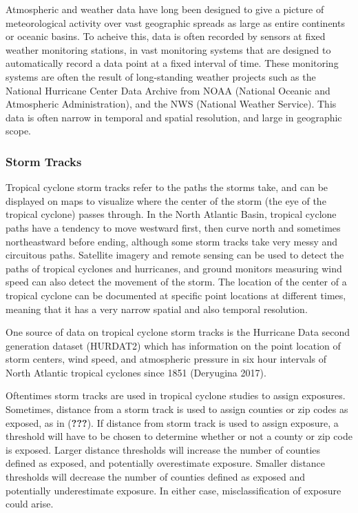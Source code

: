 \documentclass[
]{article}
\begin{document}
Atmospheric and weather data have long been designed to give a picture
of meteorological activity over vast geographic spreads as large as
entire continents or oceanic basins. To acheive this, data is often
recorded by sensors at fixed weather monitoring stations, in vast
monitoring systems that are designed to automatically record a data
point at a fixed interval of time. These monitoring systems are often
the result of long-standing weather projects such as the National
Hurricane Center Data Archive from NOAA (National Oceanic and
Atmospheric Administration), and the NWS (National Weather Service).
This data is often narrow in temporal and spatial resolution, and large
in geographic scope.

\hypertarget{storm-tracks}{%
\subsubsection{Storm Tracks}\label{storm-tracks}}

Tropical cyclone storm tracks refer to the paths the storms take, and
can be displayed on maps to visualize where the center of the storm (the
eye of the tropical cyclone) passes through. In the North Atlantic
Basin, tropical cyclone paths have a tendency to move westward first,
then curve north and sometimes northeastward before ending, although
some storm tracks take very messy and circuitous paths. Satellite
imagery and remote sensing can be used to detect the paths of tropical
cyclones and hurricanes, and ground monitors measuring wind speed can
also detect the movement of the storm. The location of the center of a
tropical cyclone can be documented at specific point locations at
different times, meaning that it has a very narrow spatial and also
temporal resolution.

One source of data on tropical cyclone storm tracks is the Hurricane
Data second generation dataset (HURDAT2) which has information on the
point location of storm centers, wind speed, and atmospheric pressure in
six hour intervals of North Atlantic tropical cyclones since 1851
(Deryugina 2017).

Oftentimes storm tracks are used in tropical cyclone studies to assign
exposures. Sometimes, distance from a storm track is used to assign
counties or zip codes as exposed, as in ({\textbf{???}}). If distance
from storm track is used to assign exposure, a threshold will have to be
chosen to determine whether or not a county or zip code is exposed.
Larger distance thresholds will increase the number of counties defined
as exposed, and potentially overestimate exposure. Smaller distance
thresholds will decrease the number of counties defined as exposed and
potentially underestimate exposure. In either case, misclassification of
exposure could arise.
\end{document}
